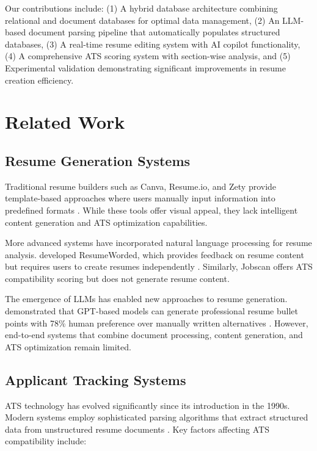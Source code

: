 \documentclass[conference]{IEEEtran}
\begin{document}
Our contributions include: (1) A hybrid database architecture combining relational and document databases for optimal data management, (2) An LLM-based document parsing pipeline that automatically populates structured databases, (3) A real-time resume editing system with AI copilot functionality, (4) A comprehensive ATS scoring system with section-wise analysis, and (5) Experimental validation demonstrating significant improvements in resume creation efficiency.

\section{Related Work}

\subsection{Resume Generation Systems}

Traditional resume builders such as Canva, Resume.io, and Zety provide template-based approaches where users manually input information into predefined formats \cite{murphy2021resume}. While these tools offer visual appeal, they lack intelligent content generation and ATS optimization capabilities.

More advanced systems have incorporated natural language processing for resume analysis. \citeauthor{resumeworded2022} developed ResumeWorded, which provides feedback on resume content but requires users to create resumes independently \cite{resumeworded2022}. Similarly, Jobscan \cite{jobscan2023} offers ATS compatibility scoring but does not generate resume content.

The emergence of LLMs has enabled new approaches to resume generation. \citeauthor{wang2023resume} demonstrated that GPT-based models can generate professional resume bullet points with 78\% human preference over manually written alternatives \cite{wang2023resume}. However, end-to-end systems that combine document processing, content generation, and ATS optimization remain limited.

\subsection{Applicant Tracking Systems}

ATS technology has evolved significantly since its introduction in the 1990s. Modern systems employ sophisticated parsing algorithms that extract structured data from unstructured resume documents \cite{taleo2023parsing}. Key factors affecting ATS compatibility include:
\end{document}
